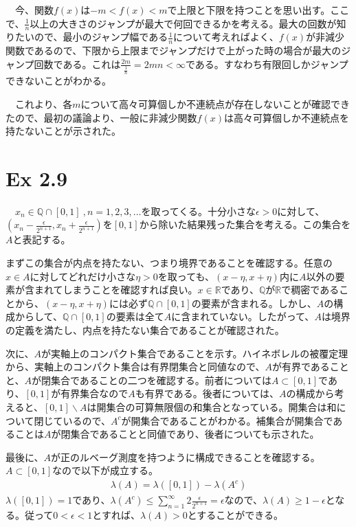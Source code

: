 \documentclass{article}
\begin{document}
　今、関数$f(x)$は$-m < f(x) < m$で上限と下限を持つことを思い出す。ここで、$\frac{1}{n}$以上の大きさのジャンプが最大で何回できるかを考える。最大の回数が知りたいので、最小のジャンプ幅である$\frac{1}{n}$について考えればよく、$f(x)$が非減少関数であるので、下限から上限までジャンプだけで上がった時の場合が最大のジャンプ回数である。これは$\frac{2m}{\frac{1}{n}} = 2mn < \infty$である。すなわち有限回しかジャンプできないことがわかる。

　これより、各$m$について高々可算個しか不連続点が存在しないことが確認できたので、最初の議論より、一般に非減少関数$f(x)$は高々可算個しか不連続点を持たないことが示された。

\section{Ex 2.9}
　$x_n \in \mathbb{Q} \cap [0,1]\ , n = 1,2,3,\dots$を取ってくる。十分小さな$\epsilon > 0$に対して、$\left( x_n -\frac{\epsilon}{2^{n+1}}, x_n + \frac{\epsilon}{2^{n+1}} \right)$を$[0,1]$から除いた結果残った集合を考える。この集合を$A$と表記する。

まずこの集合が内点を持たない、つまり境界であることを確認する。任意の$x \in A$に対してどれだけ小さな$\eta > 0$を取っても、$\left( x-\eta, x + \eta\right)$内に$A$以外の要素が含まれてしまうことを確認すれば良い。$x \in \mathbb{R}$であり、$\mathbb{Q}$が$\mathbb{R}$で稠密であることから、$\left( x-\eta, x + \eta\right)$には必ず$\mathbb{Q} \cap [0,1]$の要素が含まれる。しかし、$A$の構成からして、$\mathbb{Q} \cap [0,1]$の要素は全て$A$に含まれていない。したがって、$A$は境界の定義を満たし、内点を持たない集合であることが確認された。

次に、$A$が実軸上のコンパクト集合であることを示す。ハイネボレルの被覆定理から、実軸上のコンパクト集合は有界閉集合と同値なので、$A$が有界であることと、$A$が閉集合であることの二つを確認する。前者については$A \subset [0,1]$であり、$[0,1]$が有界集合なので$A$も有界である。後者については、$A$の構成から考えると、$[0,1]\backslash A$は開集合の可算無限個の和集合となっている。開集合は和について閉じているので、$A^c$が開集合であることがわかる。補集合が開集合であることは$A$が閉集合であることと同値であり、後者についても示された。

最後に、$A$が正のルベーグ測度を持つように構成できることを確認する。$A \subset [0,1]$なので以下が成立する。
\begin{align*}
	\lambda \left( A \right) = \lambda \left( [0,1] \right) - \lambda\left( A^c \right)
\end{align*}
$\lambda \left( [0,1] \right) = 1$であり、$\lambda\left( A^c \right) \leq \sum_{n = 1}^{\infty} 2\frac{\epsilon}{2^{n+1}} = \epsilon$なので、$\lambda \left( A \right) \geq 1-\epsilon$となる。従って$0 < \epsilon < 1$とすれば、$\lambda \left( A \right) > 0$とすることができる。
\end{document}
